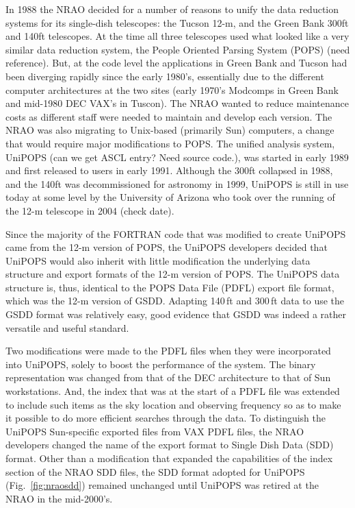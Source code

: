 \documentclass[final,authoryear,5p,times,twocolumn]{elsarticle}
\begin{document}
In 1988 the NRAO decided for a number of reasons to unify the data
reduction systems for its single-dish telescopes: the Tucson 12-m, and
the Green Bank 300ft and 140ft telescopes.  At the time all three
telescopes used what looked like a very similar data reduction system,
the People Oriented Parsing System (POPS) {\color{red} (need
  reference)}.  But, at the code level the applications in Green Bank
and Tucson had been diverging rapidly since the early 1980's,
essentially due to the different computer architectures at the two
sites (early 1970's Modcomps in Green Bank and mid-1980 DEC VAX's in
Tuscon).  The NRAO wanted to reduce maintenance costs as different
staff were needed to maintain and develop each version.  The NRAO was
also migrating to Unix-based (primarily Sun) computers, a change that
would require major modifications to POPS. The unified analysis system, UniPOPS
\citep{UNIPOPS} {\color{red} (can we get ASCL entry? Need source
  code.)}, was started in early 1989 and first released to users in early
1991.  Although the 300ft collapsed in 1988, and the 140ft was
decommissioned for astronomy in 1999, UniPOPS is still in use today at
some level by the University of Arizona who took over the running of
the 12-m telescope in 2004 {\color{red} (check date)}.

Since the majority of the FORTRAN code that was modified to create
UniPOPS came from the 12-m version of POPS, the UniPOPS developers
decided that UniPOPS would also inherit with little modification the
underlying data structure and export formats of the 12-m version of
POPS.  The UniPOPS data structure is, thus, identical to the POPS Data File
(PDFL) export file format, which was the 12-m version of GSDD.  Adapting 140\,ft
and 300\,ft data to use the GSDD format was
relatively easy, good evidence that GSDD was indeed a rather versatile
and useful standard.

Two modifications were made to the PDFL files when they were
incorporated into UniPOPS, solely to boost the performance of the
system.  The binary representation was changed from that of the DEC
architecture to that of Sun workstations.  And, the index that was at
the start of a PDFL file was extended to include such items as the sky
location and observing frequency so as to make it possible to do more
efficient searches through the data.  To distinguish the UniPOPS
Sun-specific exported files from VAX PDFL files, the NRAO developers
changed the name of the export format to Single Dish Data (SDD) format.
Other than a modification that expanded the capabilities of the index
section of the NRAO SDD files, the SDD format adopted for UniPOPS
(Fig.~\ref{fig:nraosdd}) remained unchanged until UniPOPS was retired
at the NRAO in the mid-2000's.
\end{document}
